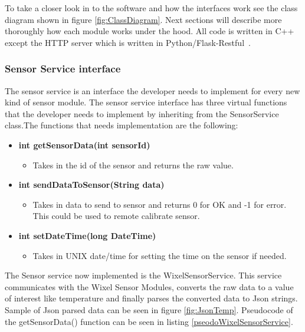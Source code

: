 To take a closer look in to the software and how the interfaces work see the class diagram
shown in figure \ref{fig:ClassDiagram}. Next sections will describe more thoroughly how each module works under the hood. All code is written in C++ except the HTTP server which is written in Python/Flask-Restful~\cite{Flask}.

\subsubsection{Sensor Service interface}
The sensor service is an interface the developer needs to implement for every new kind of
sensor module. The sensor service interface has three virtual functions that the developer
needs to implement by inheriting from the SensorService class.The functions that needs implementation are the following:
\begin{itemize}
    \item \textbf{int getSensorData(int sensorId)}
        \begin{itemize}
            \item Takes in the id of the sensor and returns the raw value.
        \end{itemize}
    \item \textbf{int sendDataToSensor(String data)}
        \begin{itemize}
            \item Takes in data to send to sensor and returns 0 for OK and -1 for error.
                  This could be used to remote calibrate sensor.
        \end{itemize}
    \item \textbf{int setDateTime(long DateTime)}
        \begin{itemize}
            \item Takes in UNIX date/time for setting the time on the sensor if needed.
        \end{itemize}
\end{itemize}
The Sensor service now implemented is the WixelSensorService. This service communicates 
with the Wixel Sensor Modules, converts the raw data to a value of interest like 
temperature and finally parses the converted data to Json\cite{json} strings. Sample
of Json parsed data can be seen in figure \ref{fig:JsonTemp}. Pseudocode of the 
getSensorData() function can be seen in listing \ref{pseodoWixelSensorService}.

